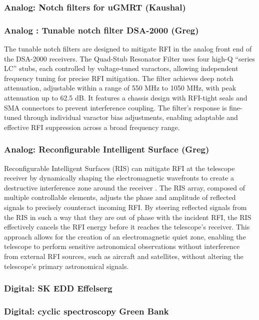 \subsubsection{Analog: Notch filters for uGMRT (Kaushal)}
\subsubsection{Analog : Tunable notch filter DSA-2000 (Greg)}

The tunable notch filters are designed to mitigate RFI in the analog front end of the DSA-2000 receivers. The Quad-Stub Resonator Filter uses four high-Q “series LC” stubs, each controlled by voltage-tuned varactors, allowing independent frequency tuning for precise RFI mitigation. The filter achieves deep notch attenuation, adjustable within a range of 550 MHz to 1050 MHz, with peak attenuation up to 62.5 dB. It features a chassis design with RFI-tight seals and SMA connectors to prevent interference coupling. The filter's response is fine-tuned through individual varactor bias adjustments, enabling adaptable and effective RFI suppression across a broad frequency range.

\subsubsection{Analog: Reconfigurable Intelligent Surface (Greg)}

Reconfigurable Intelligent Surfaces (RIS) can mitigate RFI at the telescope receiver by dynamically shaping the electromagnetic wavefronts to create a destructive interference zone around the receiver \cite{zou2022scisrs,wei2024ris,wei2023multistage}. The RIS array, composed of multiple controllable elements, adjusts the phase and amplitude of reflected signals to precisely counteract incoming RFI. By steering reflected signals from the RIS in such a way that they are out of phase with the incident RFI, the RIS effectively cancels the RFI energy before it reaches the telescope’s receiver. This approach allows for the creation of an electromagnetic quiet zone, enabling the telescope to perform sensitive astronomical observations without interference from external RFI sources, such as aircraft and satellites, without altering the telescope’s primary astronomical signals.

\subsubsection{Digital: SK EDD Effelserg}
\subsubsection{Digital: cyclic spectroscopy Green Bank}

